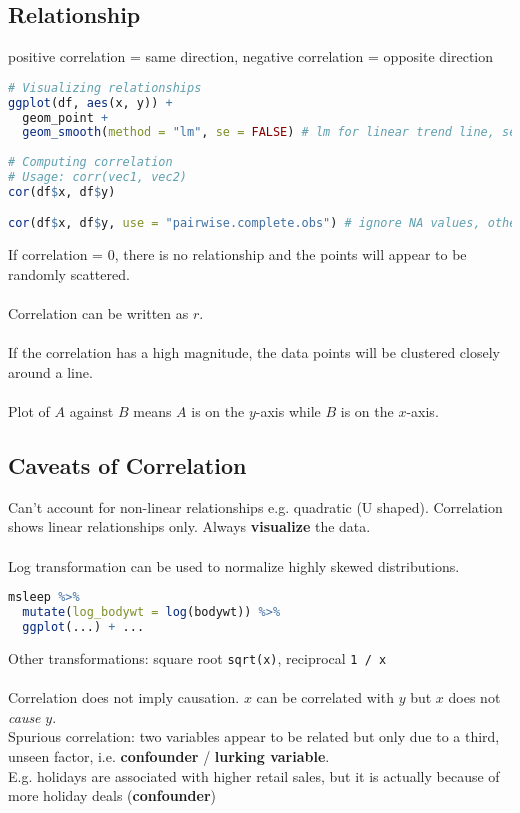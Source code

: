 \documentclass[11pt]{article}
\begin{document}
\subsection{Relationship}

positive correlation = same direction, negative correlation = opposite direction

\begin{lstlisting}[language=R]
# Visualizing relationships
ggplot(df, aes(x, y)) + 
  geom_point + 
  geom_smooth(method = "lm", se = FALSE) # lm for linear trend line, se = false for no error margin
  
# Computing correlation
# Usage: corr(vec1, vec2)
cor(df$x, df$y)

cor(df$x, df$y, use = "pairwise.complete.obs") # ignore NA values, otherwise corr returns NA
\end{lstlisting}

If correlation = 0, there is no relationship and the points will appear to be randomly scattered. \\ \; \\
Correlation can be written as $r$. \\ \; \\
If the correlation has a high magnitude, the data points will be clustered closely around a line.
\\\;\\
Plot of $A$ against $B$ means $A$ is on the $y$-axis while $B$ is on the $x$-axis.

\subsection{Caveats of Correlation}
Can't account for non-linear relationships e.g. quadratic (U shaped). Correlation shows linear relationships only. Always \textbf{visualize} the data.\\\;\\
Log transformation can be used to normalize highly skewed distributions.

\begin{lstlisting}[language=R]
msleep %>%
  mutate(log_bodywt = log(bodywt)) %>%
  ggplot(...) + ...
\end{lstlisting}
Other transformations: square root \lstinline|sqrt(x)|, reciprocal \lstinline|1 / x|\\\;\\
Correlation does not imply causation. $x$ can be correlated with $y$ but $x$ does not \emph{cause} $y$. \\
Spurious correlation: two variables appear to be related but only due to a third, unseen factor, i.e. \textbf{confounder} / \textbf{lurking variable}.\\
E.g. holidays are associated with higher retail sales, but it is actually because of more holiday deals (\textbf{confounder})
\end{document}
